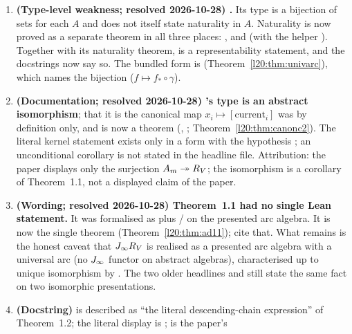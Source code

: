 \begin{enumerate}
\item \textbf{(Type-level weakness; resolved 2026-10-28) .} Its type is a bijection of sets for each
  $A$ and does not itself state naturality in $A$. Naturality is now proved as a separate theorem in all three places:
  ,
   and
   (with the helper
  ). Together with its naturality theorem,
   is a representability statement, and the docstrings now say so. The bundled form is
   (Theorem~\ref{l20:thm:univarc}), which names the bijection ($f\mapsto f_*\circ\gamma$).
\item \textbf{(Documentation; resolved 2026-10-28) 's type is an abstract isomorphism}; that it is
  the canonical map $x_i\mapsto[\text{current}_i]$ was by definition only, and is now a theorem (,
  ; Theorem~\ref{l20:thm:canonc2}). The literal kernel statement 
  exists only in a form with the hypothesis ; an unconditional corollary is not stated in the headline file.
  Attribution: the paper displays only the surjection $A_m\twoheadrightarrow R_V$; the isomorphism is a corollary
  of Theorem~1.1, not a displayed claim of the paper.
\item \textbf{(Wording; resolved 2026-10-28) Theorem~1.1 had no single Lean statement.} It was formalised as
   plus / on the presented arc algebra. It is now
  the single theorem  (Theorem~\ref{l20:thm:ad11}); cite that. What remains is the honest caveat
  that $J_\infty R_V$ is realised as a presented arc algebra with a universal arc (no $J_\infty$ functor on abstract
  algebras), characterised up to unique isomorphism by . The two older headlines
   and  still state the same fact on two isomorphic
  presentations.
\item \textbf{(Docstring) } is described as ``the literal descending-chain expression'' of
  Theorem~1.2; the literal display is ;  is the paper's

\end{enumerate}

